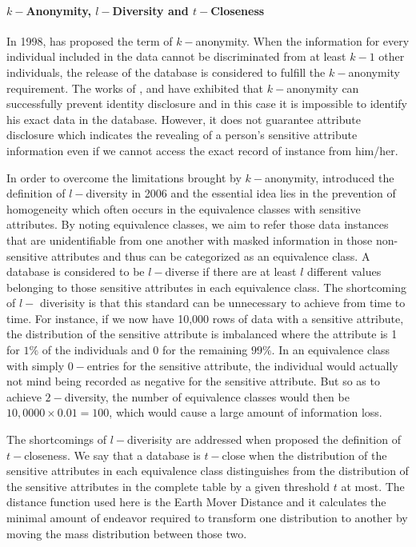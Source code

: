 \paragraph{$k-$Anonymity, $l-$Diversity and $t-$Closeness}
In 1998, \citet{sweeney2002k} has proposed the term of $k-$anonymity. When the information for every individual included in the data
cannot be discriminated from at least $k-1$ other individuals, the release of the database is considered to fulfill the
$k-$anonymity requirement. The works of \citet{machanavajjhala2007diversity}, \citet{truta2006privacy} and \citet{xiao2006personalized}
have exhibited that $k-$anonymity can successfully prevent identity disclosure and in this case it is impossible to identify
his exact data in the database. However, it does not guarantee attribute disclosure which indicates the revealing of a person's
sensitive attribute information even if we cannot access the exact record of instance from him/her. 

In order to overcome the limitations brought by $k-$anonymity, \citet{machanavajjhala2007diversity} introduced the definition of $l-$diversity in 2006 and the
essential idea lies in the prevention of homogeneity which often occurs in the equivalence classes with sensitive attributes.
By noting equivalence classes, we aim to refer those data instances that are unidentifiable from one another with masked information
in those non-sensitive attributes and thus can be categorized as an equivalence class. A database is considered to be $l-$diverse
if there are at least $l$ different values belonging to those sensitive attributes in each equivalence class. The shortcoming of $l-$ diverisity
is that this standard can be unnecessary to achieve from time to time. For instance, if we now have 10,000 rows of data with a sensitive attribute,
the distribution of the sensitive attribute is imbalanced where the attribute is 1 for $1\%$ of the individuals and 0 for the remaining
$99\%$. In an equivalence class with simply $0-$entries for the sensitive attribute, the individual would actually not mind being
recorded as negative for the sensitive attribute. But so as to achieve $2-$diversity, the number of equivalence classes would
then be $10,0000 \times 0.01 = 100$, which would cause a large amount of information loss.

The shortcomings of $l-$diverisity are addressed when \citet{xiao2006personalized} proposed the definition of $t-$closeness. We say that a database
is $t-$close when the distribution of the sensitive attributes in each equivalence class distinguishes from the distribution of the sensitive attributes 
in the complete table by a given threshold $t$ at most. The distance function used here is the Earth Mover Distance \citep{rubner2000earth} and it
calculates the minimal amount of endeavor required to transform one distribution to another by moving the mass distribution between those two.


